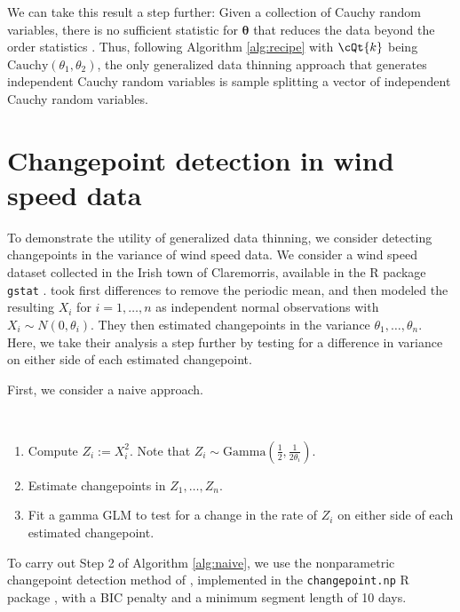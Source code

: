 \documentclass[12pt]{article}
\begin{document}
We can take this result a step further: Given a collection of Cauchy random variables, there is no sufficient statistic for $\boldsymbol\theta$ that reduces the data beyond the order statistics
\citep[p.~275]{CaseBerg}. 
Thus, following Algorithm \ref{alg:recipe} with $\cQt{k}$ being $\text{Cauchy}(\theta_1,\theta_2)$, the only generalized data thinning approach that generates independent Cauchy random variables is sample splitting a vector of independent Cauchy random variables. %



\section{Changepoint detection in wind speed data}
\label{sec:changepoint}

To demonstrate the utility of generalized data thinning, we consider detecting changepoints in the variance of wind speed data. We consider a wind speed dataset \citep{haslett1989space} collected in the Irish town of Claremorris, available in the R package \texttt{gstat} \citep{pebesma2004multivariable}. 
\citet{killick2014changepoint} took first differences to remove the periodic mean, and then modeled the
resulting $X_i$ for $i = 1, \dots, n$ as independent normal observations with $X_i \sim N(0, \theta_i)$. They then estimated changepoints in the variance $\theta_1,\ldots,\theta_n$. Here, we take their analysis a step further by testing for a difference in variance on either side of each estimated changepoint. 


First, we consider a naive approach.

\begin{algorithm}\label{alg:naive}
\textcolor{white}{.}
\begin{enumerate}
    \item Compute $Z_i := X_i^2$. Note that $Z_i  \sim \text{Gamma}\left(\frac{1}{2}, \frac{1}{2\theta_i}\right)$.
    \item Estimate changepoints in $Z_1,\ldots,Z_n$.
    \item Fit a gamma GLM to test for a change in the rate of $Z_i$ on either side of each estimated changepoint.  
\end{enumerate}
\end{algorithm}
To carry out  Step 2 of Algorithm \ref{alg:naive}, we use the nonparametric changepoint detection method of \citet{haynes2017computationally}, implemented in the \texttt{changepoint.np} R package \citep{cpt.np}, with a BIC penalty and a minimum segment length of 10 days.
\end{document}

